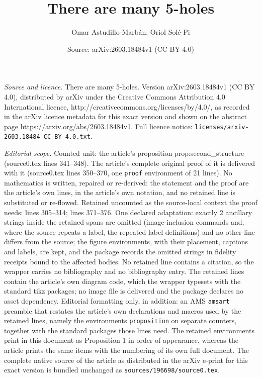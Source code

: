 \documentclass[10pt,a4paper]{amsart}
\title{There are many 5-holes}
\author{Omar Astudillo-Marb\'an, Oriol Sol\'e-Pi}
\date{Source: arXiv:2603.18484v1 (CC BY 4.0)}
\begin{document}
\maketitle

\noindent\emph{Source and licence.} There are many 5-holes. Version arXiv:2603.18484v1 (CC BY 4.0), distributed by arXiv under the Creative Commons Attribution 4.0 International licence, http://creativecommons.org/licenses/by/4.0/, as recorded in the arXiv licence metadata for this exact version and shown on the abstract page https://arxiv.org/abs/2603.18484v1. Full licence notice: \texttt{licenses/arxiv-2603.18484-CC-BY-4.0.txt}.\par\smallskip

\noindent\textit{Editorial scope.} Counted unit: the article's proposition prop:second\_structure (source0.tex lines 341--348). The article's complete original proof of it is delivered with it (source0.tex lines 350--370, one \texttt{proof} environment of 21 lines). No mathematics is written, repaired or re-derived: the statement and the proof are the article's own lines, in the article's own notation, and no retained line is substituted or re-flowed.  Retained uncounted as the source-local context the proof needs: lines 305--314; lines 371--376.  One declared adaptation: exactly 2 ancillary strings inside the retained spans are omitted (image-inclusion commands and, where the source repeats a label, the repeated label definitions) and no other line differs from the source; the figure environments, with their placement, captions and labels, are kept, and the package records the omitted strings in fidelity receipts bound to the affected bodies.  No retained line contains a citation, so the wrapper carries no bibliography and no bibliography entry.  The retained lines contain the article's own diagram code, which the wrapper typesets with the standard tikz packages; no image file is delivered and the package declares no asset dependency.  Editorial formatting only, in addition: an AMS \texttt{amsart} preamble that restates the article's own declarations and macros used by the retained lines, namely the environments \texttt{proposition} on separate counters, together with the standard packages those lines need.  The retained environments print in this document as Proposition 1 in order of appearance, whereas the article prints the same items with the numbering of its own full document.  The complete native source of the article as distributed in the arXiv e-print for this exact version is bundled unchanged as \texttt{sources/196698/source0.tex}.
\end{document}
